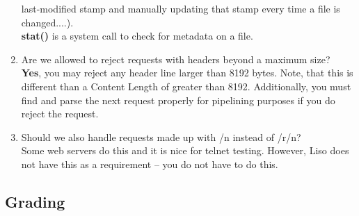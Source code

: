 \begin{enumerate}
     last-modified stamp and manually updating that stamp every time a file is
     changed....).\\
    \textbf{stat()} is a system call to check for metadata on a file. 
    \item Are we allowed to reject requests with headers beyond a maximum size?\\
    \textbf{Yes}, you may reject any header line larger than 8192 bytes. Note, that this is different than a Content Length of greater than 8192. Additionally, you must find and parse the next request properly for pipelining purposes if you do reject the request.
    \item Should we also handle requests made up with /n instead of /r/n?\\
    Some web servers do this and it is nice for telnet testing. However, Liso does not have this as a requirement -- you do not have to do this.
\end{enumerate}

\subsection{Grading}

